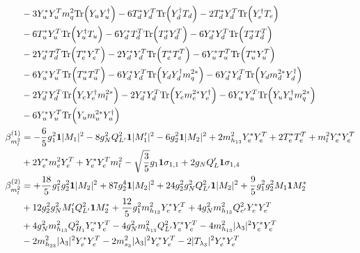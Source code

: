 {\begin{align}
 &-3 {Y_u^*  Y_{u}^{T}  m_q^2} \mbox{Tr}\Big({Y_u  Y_{u}^{\dagger}}\Big) -6 {T_d^*  Y_{d}^{T}} \mbox{Tr}\Big({Y_{d}^{\dagger}  T_d}\Big) -2 {T_d^*  Y_{d}^{T}} \mbox{Tr}\Big({Y_{e}^{\dagger}  T_e}\Big) \nonumber \\ 
 &-6 {T_u^*  Y_{u}^{T}} \mbox{Tr}\Big({Y_{u}^{\dagger}  T_u}\Big) -6 {Y_d^*  T_{d}^{T}} \mbox{Tr}\Big({T_d^*  Y_{d}^{T}}\Big) -6 {Y_d^*  Y_{d}^{T}} \mbox{Tr}\Big({T_d^*  T_{d}^{T}}\Big) \nonumber \\ 
 &-2 {Y_d^*  T_{d}^{T}} \mbox{Tr}\Big({T_e^*  Y_{e}^{T}}\Big) -2 {Y_d^*  Y_{d}^{T}} \mbox{Tr}\Big({T_e^*  T_{e}^{T}}\Big) -6 {Y_u^*  T_{u}^{T}} \mbox{Tr}\Big({T_u^*  Y_{u}^{T}}\Big) \nonumber \\ 
 &-6 {Y_u^*  Y_{u}^{T}} \mbox{Tr}\Big({T_u^*  T_{u}^{T}}\Big) -6 {Y_d^*  Y_{d}^{T}} \mbox{Tr}\Big({Y_d  Y_{d}^{\dagger}  m_q^{2 *}}\Big) -6 {Y_d^*  Y_{d}^{T}} \mbox{Tr}\Big({Y_d  m_d^{2 *}  Y_{d}^{\dagger}}\Big) \nonumber \\ 
 &-2 {Y_d^*  Y_{d}^{T}} \mbox{Tr}\Big({Y_e  Y_{e}^{\dagger}  m_l^{2 *}}\Big) -2 {Y_d^*  Y_{d}^{T}} \mbox{Tr}\Big({Y_e  m_e^{2 *}  Y_{e}^{\dagger}}\Big) -6 {Y_u^*  Y_{u}^{T}} \mbox{Tr}\Big({Y_u  Y_{u}^{\dagger}  m_q^{2 *}}\Big) \nonumber \\ 
 &-6 {Y_u^*  Y_{u}^{T}} \mbox{Tr}\Big({Y_u  m_u^{2 *}  Y_{u}^{\dagger}}\Big) \\ 
\beta_{m_l^2}^{(1)} & =  
-\frac{6}{5} g_{1}^{2} {\bf 1} |M_1|^2 -8 g_{N}^{2} Q_{L'}^{2} {\bf 1} |M_1'|^2 -6 g_{2}^{2} {\bf 1} |M_2|^2 +2 m_{h_{13}}^2 {Y_e^*  Y_{e}^{T}} +2 {T_e^*  T_{e}^{T}} +{m_l^2  Y_e^*  Y_{e}^{T}}\nonumber \\ 
 &+2 {Y_e^*  m_e^2  Y_{e}^{T}} +{Y_e^*  Y_{e}^{T}  m_l^2}- \sqrt{\frac{3}{5}} g_1 {\bf 1} \sigma_{1,1} +2 g_N Q_L' {\bf 1} \sigma_{1,4} \\ 
\beta_{m_l^2}^{(2)} & =  
+\frac{18}{5} g_{1}^{2} g_{2}^{2} {\bf 1} |M_2|^2 +87 g_{2}^{4} {\bf 1} |M_2|^2 +24 g_{2}^{2} g_{N}^{2} Q_{L'}^{2} {\bf 1} |M_2|^2 +\frac{9}{5} g_{1}^{2} g_{2}^{2} M_1 {\bf 1} M_2^* \nonumber \\ 
 &+12 g_{2}^{2} g_{N}^{2} M_1' Q_{L'}^{2} {\bf 1} M_2^* +\frac{12}{5} g_{1}^{2} m_{h_{13}}^2 {Y_e^*  Y_{e}^{T}} +4 g_{N}^{2} m_{h_{13}}^2 Q_{e'}^{2} {Y_e^*  Y_{e}^{T}} \nonumber \\ 
 &+4 g_{N}^{2} m_{h_{13}}^2 Q_{H_1}^{2} {Y_e^*  Y_{e}^{T}} -4 g_{N}^{2} m_{h_{13}}^2 Q_{L'}^{2} {Y_e^*  Y_{e}^{T}} -4 m_{h_{13}}^2 |\lambda_3|^2 {Y_e^*  Y_{e}^{T}} \nonumber \\ 
 &-2 m_{h_{23}}^2 |\lambda_3|^2 {Y_e^*  Y_{e}^{T}} -2 m_{s_3}^2 |\lambda_3|^2 {Y_e^*  Y_{e}^{T}} -2 |T_{\lambda_3}|^2 {Y_e^*  Y_{e}^{T}} \nonumber \\ 

\end{align}}
